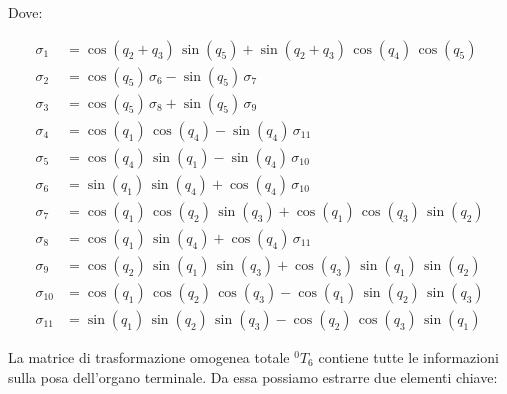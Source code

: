 \documentclass[11pt, a4paper]{article}
\begin{document}
\begin{matlabsymbolicoutput}
\vspace{0.5em}
\noindent Dove:
\vspace{-0.5em}

\[
\begin{aligned}
\sigma_1 &= \cos \left(q_2 +q_3 \right)\,\sin \left(q_5 \right)+\sin \left(q_2 +q_3 \right)\,\cos \left(q_4 \right)\,\cos \left(q_5 \right) \\
\sigma_2 &= \cos \left(q_5 \right)\,\sigma_6 -\sin \left(q_5 \right)\,\sigma_7 \\
\sigma_3 &= \cos \left(q_5 \right)\,\sigma_8 +\sin \left(q_5 \right)\,\sigma_9 \\
\sigma_4 &= \cos \left(q_1 \right)\,\cos \left(q_4 \right)-\sin \left(q_4 \right)\,\sigma_{11} \\
\sigma_5 &= \cos \left(q_4 \right)\,\sin \left(q_1 \right)-\sin \left(q_4 \right)\,\sigma_{10} \\
\sigma_6 &= \sin \left(q_1 \right)\,\sin \left(q_4 \right)+\cos \left(q_4 \right)\,\sigma_{10} \\
\sigma_7 &= \cos \left(q_1 \right)\,\cos \left(q_2 \right)\,\sin \left(q_3 \right)+\cos \left(q_1 \right)\,\cos \left(q_3 \right)\,\sin \left(q_2 \right) \\
\sigma_8 &= \cos \left(q_1 \right)\,\sin \left(q_4 \right)+\cos \left(q_4 \right)\,\sigma_{11} \\
\sigma_9 &= \cos \left(q_2 \right)\,\sin \left(q_1 \right)\,\sin \left(q_3 \right)+\cos \left(q_3 \right)\,\sin \left(q_1 \right)\,\sin \left(q_2 \right) \\
\sigma_{10} &= \cos \left(q_1 \right)\,\cos \left(q_2 \right)\,\cos \left(q_3 \right)-\cos \left(q_1 \right)\,\sin \left(q_2 \right)\,\sin \left(q_3 \right) \\
\sigma_{11} &= \sin \left(q_1 \right)\,\sin \left(q_2 \right)\,\sin \left(q_3 \right)-\cos \left(q_2 \right)\,\cos \left(q_3 \right)\,\sin \left(q_1 \right)
\end{aligned}
\]
\end{matlabsymbolicoutput}

\begin{par}
\begin{flushleft}
La matrice di trasformazione omogenea totale $^0 T_6$ contiene tutte le informazioni sulla posa dell'organo terminale. Da essa possiamo estrarre due elementi chiave:
\end{flushleft}
\end{par}
\end{document}

